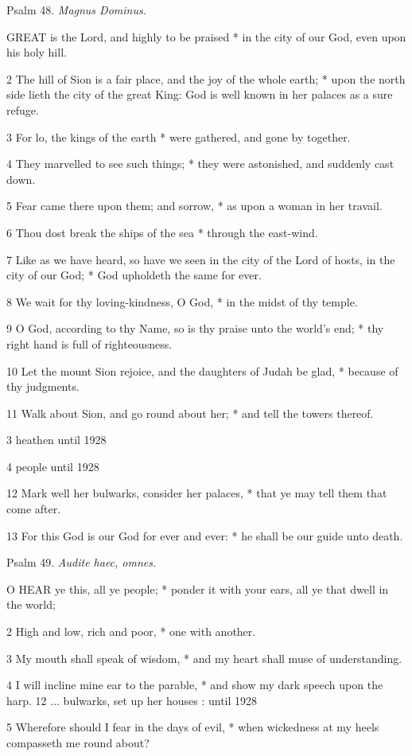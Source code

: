 Psalm
48. \emph{Magnus Dominus.}

GREAT
is the Lord, and highly to be praised * in the city of our God, even upon
his holy hill.

2 The hill of Sion is a fair place, and the joy of
the whole earth; * upon the north side lieth the city of the great King:
God is well known in her palaces as a sure refuge.

3 For lo, the kings of the earth * were gathered, and
gone by together.

4 They marvelled to see such things; * they were astonished,
and suddenly cast down.

5 Fear came there upon them; and sorrow, * as upon
a woman in her travail.

6 Thou dost break the ships of the sea * through the
east-wind.

7 Like as we have heard, so have we seen in the city
of the Lord of hosts, in the city of our God; * God upholdeth the same
for ever.

8 We wait for thy loving-kindness, O God, * in the
midst of thy temple.

9 O God, according to thy Name, so is thy praise unto
the world's end; * thy right hand is full of righteousness.

10 Let the mount Sion rejoice, and the daughters of
Judah be glad, * because of thy judgments.

11 Walk about Sion, and go round about her; * and tell
the towers thereof.

3 heathen
until 1928

4 people
until 1928

12 Mark well her bulwarks, consider her palaces, *
that ye may tell them that come after.

13 For this God is our God for ever and ever: * he
shall be our guide unto death.

Psalm
49. \emph{Audite haec, omnes.}

O
HEAR ye this, all ye people; * ponder it with your ears, all ye that dwell
in the world;

2 High and low, rich and poor, * one with another.

3 My mouth shall speak of wisdom, * and my heart shall
muse of understanding.

4 I will incline mine ear to the parable, * and show
my dark speech upon the harp. 12 ... bulwarks, set up her
houses :
until 1928

5 Wherefore should I fear in the days of evil, * when
wickedness at my heels compasseth me round about?

